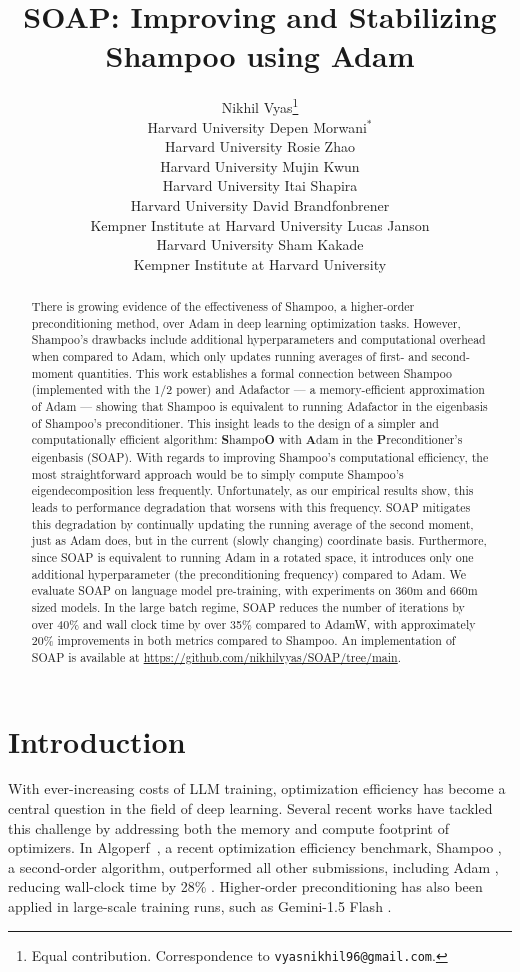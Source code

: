 \documentclass{article}
\title{SOAP: Improving and Stabilizing Shampoo using Adam}
\author{
Nikhil Vyas\thanks{Equal contribution. Correspondence to \texttt{vyasnikhil96@gmail.com}.}\\
Harvard University
\And
Depen Morwani$^*$\\
Harvard University
\And
Rosie Zhao\\
Harvard University
\And
Mujin Kwun\\
Harvard University
\And
Itai Shapira\\
Harvard University
\And
David Brandfonbrener\\
Kempner Institute at Harvard University
\And
Lucas Janson\\
Harvard University
\And 
Sham Kakade\\
Kempner Institute at Harvard University
}
\begin{document}
\maketitle

\begin{abstract}
There is growing evidence of the effectiveness of Shampoo, a higher-order preconditioning method, over Adam in deep learning optimization tasks. However, Shampoo's drawbacks include additional hyperparameters and computational overhead when compared to Adam, which only updates running averages of first- and second-moment quantities. This work establishes a formal connection between Shampoo (implemented with the 1/2 power) and Adafactor --- a memory-efficient approximation of Adam --- showing that Shampoo is equivalent to running Adafactor in the eigenbasis of Shampoo's preconditioner. This insight leads to the design of a simpler and computationally efficient algorithm: \textbf{S}hampo\textbf{O} with \textbf{A}dam in the \textbf{P}reconditioner's eigenbasis (SOAP).
With regards to improving Shampoo's computational efficiency, the most straightforward approach would be to simply compute Shampoo's eigendecomposition less frequently. 
Unfortunately, as our empirical results show, this leads to performance degradation that worsens with this frequency.
SOAP mitigates this degradation by continually updating the running average of the second moment, just as Adam does, but in the current (slowly changing) coordinate basis. Furthermore, since SOAP is equivalent to running Adam in a rotated space, it introduces only one additional hyperparameter (the preconditioning frequency) compared to Adam. We evaluate SOAP on language model pre-training, with experiments on 360m and 660m sized models. In the large batch regime, SOAP reduces the number of iterations by over 40\% and wall clock time by over 35\% compared to AdamW, with approximately 20\% improvements in both metrics compared to Shampoo. An implementation of SOAP is available at \url{https://github.com/nikhilvyas/SOAP/tree/main}.
\end{abstract}

\section{Introduction}

With ever-increasing costs of LLM training, optimization efficiency has become a central question in the field of deep learning. Several recent works have tackled this challenge by addressing both the memory \citep{galore, 4bitshampoo} and compute \citep{anil2020scalable} footprint of optimizers. In Algoperf~\citep{dahl2023benchmarking}, a recent optimization efficiency benchmark, Shampoo \citep{gupta2018shampoo}, a second-order algorithm, outperformed all other submissions, including Adam \citep{adam}, reducing wall-clock time by 28\% \citep{algoperfresults}. Higher-order preconditioning has also been applied in large-scale training runs, such as Gemini-1.5 Flash \citep{gemini15}.
\end{document}
